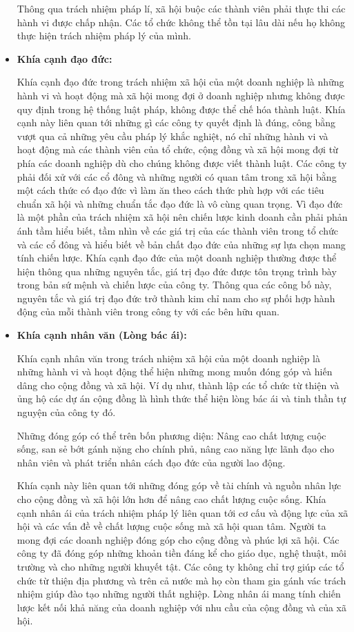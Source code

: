 \documentclass{article}
\begin{document}
\begin{itemize}
            \qquad Thông qua trách nhiệm pháp lí, xã hội buộc các thành viên phải thực thi các hành vi được chấp nhận. Các tổ chức không thể tồn tại lâu dài nếu họ không thực hiện trách nhiệm pháp lý của mình.

            \item \textbf{Khía cạnh đạo đức:}
            
            \qquad Khía cạnh đạo đức trong trách nhiệm xã hội của một doanh nghiệp là những hành vi và hoạt động mà xã hội mong đợi ở doanh nghiệp nhưng không được quy định trong hệ thống luật pháp, không được thể chế hóa thành luật. Khía cạnh này liên quan tới những gì các công ty quyết định là đúng, công bằng vượt qua cả những yêu cầu pháp lý khắc nghiệt, nó chỉ những hành vi và hoạt động mà các thành viên của tổ chức, cộng đồng và xã hội mong đợi từ phía các doanh nghiệp dù cho chúng không được viết thành luật. Các công ty phải đối xử với các cổ đông và những người có quan tâm trong xã hội bằng một cách thức có đạo đức vì làm ăn theo cách thức phù hợp với các tiêu chuẩn xã hội và những chuẩn tắc đạo đức là vô cùng quan trọng. Vì đạo đức là một phần của trách nhiệm xã hội nên chiến lược kinh doanh cần phải phản ánh tầm hiểu biết, tầm nhìn về các giá trị của các thành viên trong tổ chức và các cổ đông và hiểu biết về bản chất đạo đức của những sự lựa chọn mang tính chiến lược. Khía cạnh đạo đức của một doanh nghiệp thường được thể hiện thông qua những nguyên tắc, giá trị đạo đức được tôn trọng trình bày trong bản sứ mệnh và chiến lược của công ty. Thông qua các công bố này, nguyên tắc và giá trị đạo đức trở thành kim chỉ nam cho sự phối hợp hành động của mỗi thành viên trong công ty với các bên hữu quan.

            \item \textbf{Khía cạnh nhân văn (Lòng bác ái):}
            
            \qquad Khía cạnh nhân văn trong trách nhiệm xã hội của một doanh nghiệp là những hành vi và hoạt động thể hiện những mong muốn đóng góp và hiến dâng cho cộng đồng và xã hội. Ví dụ như, thành lập các tổ chức từ thiện và ủng hộ các dự án cộng đồng là hình thức thể hiện lòng bác ái và tinh thần tự nguyện của công ty đó.

            \qquad Những đóng góp có thể trên bốn phương diện: Nâng cao chất lượng cuộc sống, san sẻ bớt gánh nặng cho chính phủ, nâng cao năng lực lãnh đạo cho nhân viên và phát triển nhân cách đạo đức của người lao động.

            \qquad Khía cạnh này liên quan tới những đóng góp về tài chính và nguồn nhân lực cho cộng đồng và xã hội lớn hơn để nâng cao chất lượng cuộc sống. Khía cạnh nhân ái của trách nhiệm pháp lý liên quan tới cơ cấu và động lực của xã hội và các vấn đề về chất lượng cuộc sống mà xã hội quan tâm. Người ta mong đợi các doanh nghiệp đóng góp cho cộng đồng và phúc lợi xã hội. Các công ty đã đóng góp những khoản tiền đáng kể cho giáo dục, nghệ thuật, môi trường và cho những người khuyết tật. Các công ty không chỉ trợ giúp các tổ chức từ thiện địa phương và trên cả nước mà họ còn tham gia gánh vác trách nhiệm giúp đào tạo những người thất nghiệp. Lòng nhân ái mang tính chiến lược kết nối khả năng của doanh nghiệp với nhu cầu của cộng đồng và của xã hội.


\end{itemize}
\end{document}
